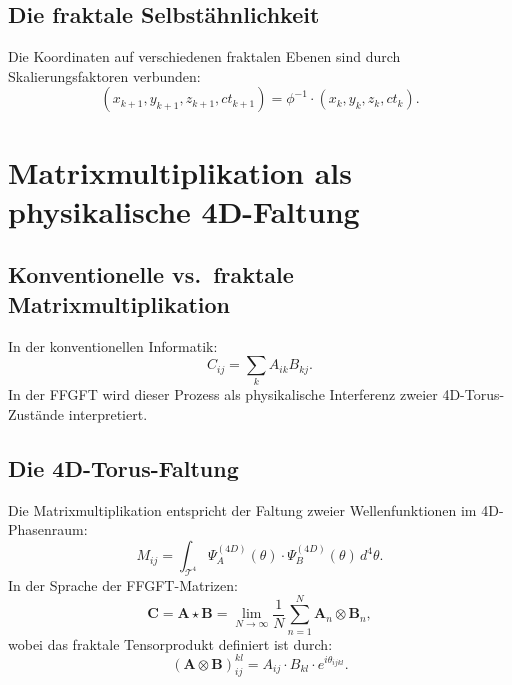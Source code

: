 \subsection{Die fraktale Selbstähnlichkeit}

Die Koordinaten auf verschiedenen fraktalen Ebenen sind durch
Skalierungsfaktoren verbunden:
\begin{equation}
  (x_{k+1}, y_{k+1}, z_{k+1}, ct_{k+1}) = \phi^{-1} \cdot
  (x_k, y_k, z_k, ct_k).
\end{equation}

\section{Matrixmultiplikation als physikalische 4D-Faltung}

\subsection{Konventionelle vs.\ fraktale Matrixmultiplikation}

In der konventionellen Informatik:
\begin{equation}
  C_{ij} = \sum_k A_{ik} B_{kj}.
\end{equation}
In der FFGFT wird dieser Prozess als physikalische Interferenz zweier
4D-Torus-Zustände interpretiert.

\subsection{Die 4D-Torus-Faltung}

Die Matrixmultiplikation entspricht der Faltung zweier Wellenfunktionen
im 4D-Phasenraum:
\begin{equation}
  M_{ij} = \int_{\mathcal{T}^4}
    \Psi_A^{(4D)}(\theta)\cdot\Psi_B^{(4D)}(\theta)\,d^4\theta.
\end{equation}
In der Sprache der FFGFT-Matrizen:
\begin{equation}
  \mathbf{C} = \mathbf{A} \star \mathbf{B}
  = \lim_{N\to\infty} \frac{1}{N}\sum_{n=1}^{N} \mathbf{A}_n \otimes \mathbf{B}_n,
\end{equation}
wobei das fraktale Tensorprodukt definiert ist durch:
\begin{equation}
  (\mathbf{A} \otimes \mathbf{B})_{ij}^{kl}
  = A_{ij} \cdot B_{kl} \cdot e^{i\theta_{ijkl}}.
\end{equation}

